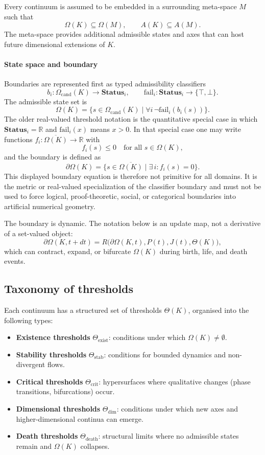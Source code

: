 Every continuum is assumed to be embedded in a surrounding meta-space \(M\) such that
\[
    \Omega(K)\subseteq\Omega(M), \qquad A(K)\subseteq A(M).
\]
The meta-space provides additional admissible states and axes that can host future dimensional extensions of \(K\).

\paragraph{State space and boundary}
Boundaries are represented first as typed admissibility classifiers
\[
    b_i:\Omega_{\mathrm{cand}}(K)\to \mathbf{Status}_i,
    \qquad
    \mathrm{fail}_i:\mathbf{Status}_i\to\{\top,\bot\}.
\]
The admissible state set is
\[
    \Omega(K)=\{s\in\Omega_{\mathrm{cand}}(K)\mid
    \forall i\,\neg\mathrm{fail}_i(b_i(s))\}.
\]
The older real-valued threshold notation is the quantitative special case in
which \(\mathbf{Status}_i=\mathbb{R}\) and \(\mathrm{fail}_i(x)\) means
\(x>0\). In that special case one may write functions
\(f_i : \overline{\Omega(K)} \to \mathbb{R}\) with
\[
    f_i(s) \le 0 \quad\text{for all } s \in \Omega(K),
\]
and the boundary is defined as
\[
    \partial\Omega(K) = \{ s \in \overline{\Omega(K)} \mid \exists\, i: f_i(s) = 0 \}.
\]
This displayed boundary equation is therefore not primitive for all domains. It
is the metric or real-valued specialization of the classifier boundary and
must not be used to force logical, proof-theoretic, social, or categorical
boundaries into artificial numerical geometry.

The boundary is dynamic. The notation below is an update map, not a derivative
of a set-valued object:
\[
    \partial\Omega(K,t+dt) =
    R\big(\partial\Omega(K,t),P(t),J(t),\Theta(K)\big),
\]
which can contract, expand, or bifurcate \(\Omega(K)\) during birth, life, and death events.

\subsection{Taxonomy of thresholds}

Each continuum has a structured set of thresholds \(\Theta(K)\), organised into the following types:

\begin{itemize}
    \item \textbf{Existence thresholds} \(\Theta_{\mathrm{exist}}\): conditions under which \(\Omega(K)\neq\emptyset\).
    \item \textbf{Stability thresholds} \(\Theta_{\mathrm{stab}}\): conditions for bounded dynamics and non-divergent flows.
    \item \textbf{Critical thresholds} \(\Theta_{\mathrm{crit}}\): hypersurfaces where qualitative changes (phase transitions, bifurcations) occur.
    \item \textbf{Dimensional thresholds} \(\Theta_{\mathrm{dim}}\): conditions under which new axes and higher-dimensional continua can emerge.
    \item \textbf{Death thresholds} \(\Theta_{\mathrm{death}}\): structural limits where no admissible states remain and \(\Omega(K)\) collapses.
\end{itemize}

